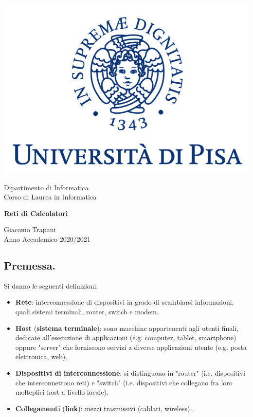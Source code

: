\documentclass[11pt, italian, openany]{book}
\begin{document}
\begin{sloppypar}
\begin{titlepage}
	\clearpage\thispagestyle{empty}
	\centering
	\vspace{1cm}

    \includegraphics[scale=0.60]{unipi-logo.png}
    
	{\normalsize \noindent Dipartimento di Informatica \\
	             Corso di Laurea in Informatica \par}
	
	\vspace{2cm}
	{\Huge \textbf{Reti di Calcolatori} \par }

    \vspace{4cm}

	{\normalsize Giacomo Trapani \\ Anno Accademico 2020/2021\par}

	\pagebreak

\end{titlepage}
\subsection*{Premessa.}
Si danno le seguenti definizioni:
\begin{itemize}[topsep=0pt]
\itemsep-0.3em
	\item \textbf{Rete}: interconnessione di dispositivi in grado di scambiarsi informazioni, quali sistemi terminali, router, switch e modem.
	\item \textbf{Host} (\textbf{sistema terminale}): sono macchine appartenenti agli utenti finali, dedicate all'esecuzione di applicazioni (e.g. computer,
	tablet, smartphone) oppure "server" che forniscono servizi a diverse applicazioni utente (e.g. posta elettronica, web).
	\item \textbf{Dispositivi di interconnessione}: si distinguono in "router" (i.e. dispositivi che interconnettono reti) e "switch"
	(i.e. dispositivi che collegano fra loro molteplici host a livello locale).
	\item \textbf{Collegamenti} (\textbf{link}): mezzi trasmissivi (cablati, wireless).
\end{itemize}

\end{sloppypar}
\end{document}
